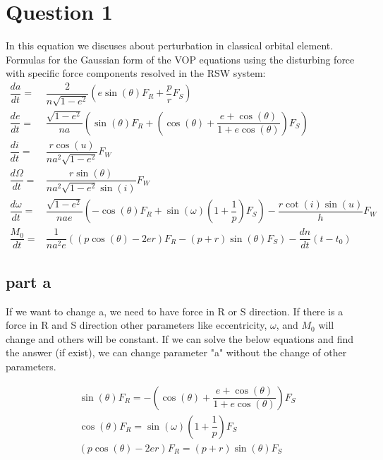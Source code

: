 \section{Question 1}
In this equation we discuses about perturbation in classical orbital element. 
Formulas for the Gaussian form of the VOP equations using the disturbing force with specific force components resolved in the RSW system:
\begin{equation}
\begin{aligned}
\dfrac{da}{dt} = & \dfrac{2}{n\sqrt{1-e^2}} \left( e\sin(\theta) F_R + \dfrac{p}{r}F_S\right) \\
\dfrac{de}{dt} =& \dfrac{\sqrt{1-e^2}}{na}\left(\sin(\theta)F_R+ \left(\cos(\theta) + \dfrac{e+\cos(\theta)}{1+e\cos(\theta)}\right)F_S\right) \\
\dfrac{di}{dt} = &\dfrac{r\cos(u)}{na^2\sqrt{1-e^2}}F_W \\
\dfrac{d\Omega}{dt} = &\dfrac{r\sin(\theta)}{na^2\sqrt{1-e^2}\sin(i)}F_W \\
\dfrac{d\omega}{dt} =& \dfrac{\sqrt{1-e^2}}{nae}\left(-\cos(\theta)F_R + \sin(\omega)\left(1+\dfrac{1}{p}\right)F_S \right) - \dfrac{r\cot(i)\sin(u)}{h}F_W\\
\dfrac{M_0}{dt} =& \dfrac{1}{na^2e} \left((p\cos(\theta) -2er)F_R - (p+r)\sin(\theta)F_S\right)-\dfrac{dn}{dt}(t - t_0)
\end{aligned}
\end{equation}
\subsection{part a}

If we want to change a, we need to have force in R or S direction. If there is a force in R and S direction other parameters like eccentricity, $\omega$, and $M_0$ will change and others will be constant. If we can solve the below equations and find the answer (if exist), we can change parameter "a" without the change of other parameters.

\begin{equation}
    \begin{aligned}
        &\sin(\theta)F_R = - \left(\cos(\theta) + \dfrac{e+\cos(\theta)}{1+e\cos(\theta)}\right)F_S\\
        &\cos(\theta)F_R = \sin(\omega)\left(1+\dfrac{1}{p}\right)F_S\\
        &(p\cos(\theta) -2er)F_R = (p+r)\sin(\theta)F_S
    \end{aligned}
\end{equation}
